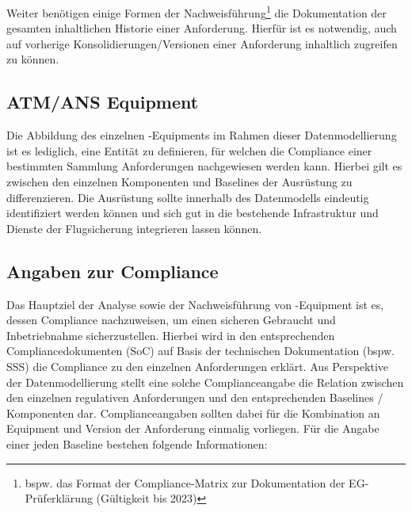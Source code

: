     \medskip
    Weiter benötigen einige Formen der Nachweisführung\footnote{bspw. das Format der Compliance-Matrix zur Dokumentation der EG-Prüferklärung (Gültigkeit bis 2023)} die Dokumentation der gesamten inhaltlichen Historie einer Anforderung.
    Hierfür ist es notwendig, auch auf vorherige Konsolidierungen/Versionen einer Anforderung inhaltlich zugreifen zu können. 
    
\subsection{ATM/ANS Equipment}
    
    Die Abbildung des einzelnen \atmans-Equipments im Rahmen dieser Datenmodellierung ist es lediglich, eine Entität zu definieren, für welchen die Compliance einer bestimmten Sammlung Anforderungen nachgewiesen werden kann.
    Hierbei gilt es zwischen den einzelnen Komponenten und Baselines der Ausrüstung zu differenzieren.
    Die Ausrüstung sollte innerhalb des Datenmodells eindeutig identifiziert werden können und sich gut in die bestehende Infrastruktur und Dienste der Flugsicherung integrieren lassen können.
    

\subsection{Angaben zur Compliance} \label{model_angaben}

    Das Hauptziel der Analyse sowie der Nachweisführung von \atmans-Equip\-ment ist es, dessen Compliance nachzuweisen, um einen sicheren Gebraucht und Inbetriebnahme sicherzustellen. 
    Hierbei wird in den entsprechenden Compliancedokumenten (\ac{SoC}) auf Basis der technischen Dokumentation (bspw. \ac{SSS}) die Compliance zu den einzelnen Anforderungen erklärt.
    Aus Perspektive der Datenmodellierung stellt eine solche Complianceangabe die Relation zwischen den einzelnen regulativen Anforderungen und den entsprechenden Baselines / Komponenten dar.
    Complianceangaben sollten dabei für die Kombination an Equipment und Version der Anforderung einmalig vorliegen. 
    Für die Angabe einer jeden Baseline bestehen folgende Informationen: 



